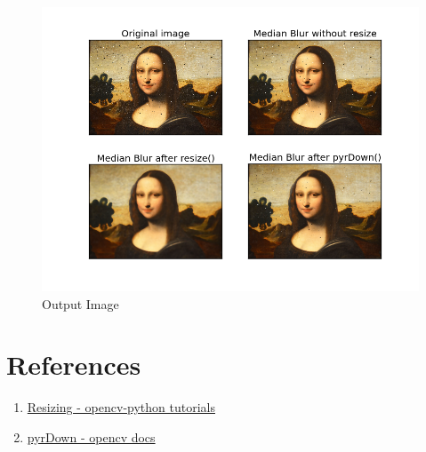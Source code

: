 \documentclass[]{article}
\providecommand{\tightlist}{%
  \setlength{\itemsep}{0pt}\setlength{\parskip}{0pt}}
\begin{document}
\begin{figure}[htbp]
\centering
\includegraphics{compare.png}
\caption{Output Image}
\end{figure}

\section{References}\label{references}

\begin{enumerate}
\def\labelenumi{\arabic{enumi}.}
\tightlist
\item
  \href{http://opencv-python-tutroals.readthedocs.org/en/latest/py\_tutorials/
  py\_imgproc/py\_pyramids/py\_pyramids.html\#pyramids}{Resizing - opencv-python tutorials}
\item
  \href{http://docs.opencv.org/modules/imgproc/doc/filtering.html\#pyrdown}{pyrDown - opencv docs}
\end{enumerate}
\end{document}
